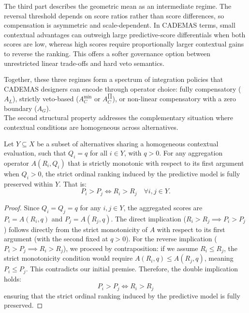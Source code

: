 \documentclass[mathematics,article,submit,moreauthors]{Definitions/mdpi}
\begin{document}
The third part describes the geometric mean as an intermediate regime. The reversal threshold depends on score ratios rather than score differences, so compensation is asymmetric and scale-dependent. In CADEMAS terms, small contextual advantages can outweigh large predictive-score differentials when both scores are low, whereas high scores require proportionally larger contextual gains to reverse the ranking. This offers a softer governance option between unrestricted linear trade-offs and hard veto semantics.

Together, these three regimes form a spectrum of integration policies that CADEMAS designers can encode through operator choice: fully compensatory ($A_L$), strictly veto-based ($A_C^{\min}$ or $A_C^{\prod}$), or non-linear compensatory with a zero boundary ($A_G$).\\

The second structural property addresses the complementary situation where contextual conditions are homogeneous across alternatives.

\begin{Proposition}
\label{prop:cont_homog_rank_preserv}
Let $Y \subseteq X$ be a subset of alternatives sharing a homogeneous contextual evaluation, such that $Q_i = q$ for all $i \in Y$, with $q > 0$. For any aggregation operator $A(R_i, Q_i)$ that is strictly monotonic with respect to its first argument when $Q_i > 0$, the strict ordinal ranking induced by the predictive model is fully preserved within $Y$. That is:
\begin{equation}
P_i > P_j \iff R_i > R_j \quad \forall i,j \in Y.
\end{equation}
\end{Proposition} 

\begin{proof}
Since $Q_i = Q_j = q$ for any $i,j \in Y$, the aggregated scores are $P_i = A(R_i, q)$ and $P_j = A(R_j, q)$.
The direct implication ($R_i > R_j \implies P_i > P_j$) follows directly from the strict monotonicity of $A$ with respect to its first argument (with the second fixed at $q > 0$). For the reverse implication ($P_i > P_j \implies R_i > R_j$), we proceed by contraposition: if we assume $R_i \leq R_j$, the strict monotonicity condition would require $A(R_i, q) \leq A(R_j, q)$, meaning $P_i \leq P_j$. This contradicts our initial premise. Therefore, the double implication holds: 
\[
P_i > P_j \iff R_i > R_j
\]
ensuring that the strict ordinal ranking induced by the predictive model is fully preserved.
\end{proof} 
\end{document}
